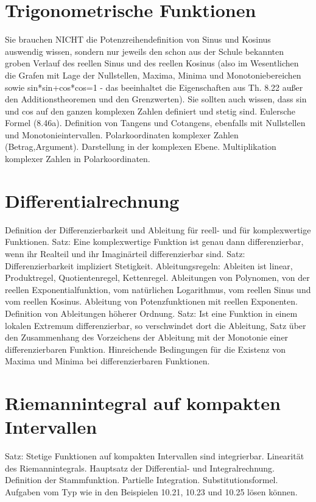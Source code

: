 \documentclass[10pt,a4paper]{article}
\begin{document}
\section{Trigonometrische Funktionen}
 
Sie brauchen NICHT die Potenzreihendefinition von Sinus und Kosinus auswendig wissen, sondern nur jeweils den schon aus der Schule bekannten groben Verlauf des reellen Sinus und des reellen Kosinus (also im Wesentlichen die Grafen mit Lage der Nullstellen, Maxima, Minima und Monotoniebereichen sowie sin*sin+cos*cos=1 - das beeinhaltet die Eigenschaften aus Th. 8.22 außer den Additionstheoremen und den Grenzwerten). Sie sollten auch wissen, dass sin und cos auf den ganzen komplexen Zahlen definiert und stetig sind. Eulersche Formel (8.46a). Definition von Tangens und Cotangens, ebenfalls mit Nullstellen und Monotonieintervallen. Polarkoordinaten komplexer Zahlen (Betrag,Argument). Darstellung in der komplexen Ebene. Multiplikation komplexer Zahlen in Polarkoordinaten. 

\section{Differentialrechnung}
 
Definition der Differenzierbarkeit und Ableitung für reell- und für komplexwertige Funktionen. Satz: Eine komplexwertige Funktion ist genau dann differenzierbar, wenn ihr Realteil und ihr Imaginärteil differenzierbar sind. Satz: Differenzierbarkeit impliziert Stetigkeit. Ableitungsregeln: Ableiten ist linear, Produktregel, Quotientenregel, Kettenregel. Ableitungen von Polynomen, von der reellen Exponentialfunktion, vom natürlichen Logarithmus, vom reellen Sinus und vom reellen Kosinus. Ableitung von Potenzfunktionen mit reellen Exponenten. Definition von Ableitungen höherer Ordnung. Satz: Ist eine Funktion in einem lokalen Extremum differenzierbar, so verschwindet dort die Ableitung, Satz über den Zusammenhang des Vorzeichens der Ableitung mit der Monotonie einer differenzierbaren Funktion. Hinreichende Bedingungen für die Existenz von Maxima und Minima bei differenzierbaren Funktionen. 

\section{Riemannintegral auf kompakten Intervallen}
 
Satz: Stetige Funktionen auf kompakten Intervallen sind integrierbar. Linearität des Riemannintegrals. Hauptsatz der Differential- und Integralrechnung. Definition der Stammfunktion. Partielle Integration. Substitutionsformel. Aufgaben vom Typ wie in den Beispielen 10.21, 10.23 und 10.25 lösen können.
\end{document}
